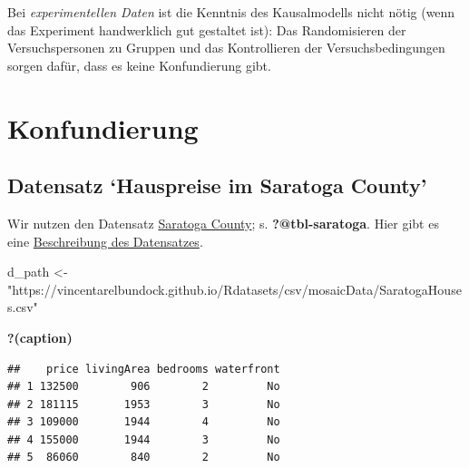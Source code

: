 \documentclass[
  a4paper,
  DIV=11]{scrreprt}
\newenvironment{Shaded}{\begin{snugshade}}{\end{snugshade}}
\newcommand{\NormalTok}[1]{\textcolor[rgb]{0.00,0.23,0.31}{#1}}
\newcommand{\OtherTok}[1]{\textcolor[rgb]{0.00,0.23,0.31}{#1}}
\newcommand{\StringTok}[1]{\textcolor[rgb]{0.13,0.47,0.30}{#1}}
\theoremstyle{definition}
\theoremstyle{remark}
\begin{document}
Bei \emph{experimentellen Daten} ist die Kenntnis des Kausalmodells
nicht nötig (wenn das Experiment handwerklich gut gestaltet ist): Das
Randomisieren der Versuchspersonen zu Gruppen und das Kontrollieren der
Versuchsbedingungen sorgen dafür, dass es keine Konfundierung gibt.

\hypertarget{konfundierung}{%
\section{Konfundierung}\label{konfundierung}}

\newcommand{\indep}{\perp \!\!\! \perp}

\hypertarget{datensatz-hauspreise-im-saratoga-county}{%
\subsection{Datensatz `Hauspreise im Saratoga
County'}\label{datensatz-hauspreise-im-saratoga-county}}

Wir nutzen den Datensatz
\href{https://vincentarelbundock.github.io/Rdatasets/csv/mosaicData/SaratogaHouses.csv}{Saratoga
County}; s. \textbf{?@tbl-saratoga}. Hier gibt es eine
\href{https://vincentarelbundock.github.io/Rdatasets/doc/mosaicData/SaratogaHouses.html}{Beschreibung
des Datensatzes}.

\begin{Shaded}
\begin{Highlighting}[]
\NormalTok{d\_path }\OtherTok{\textless{}{-}} \StringTok{"https://vincentarelbundock.github.io/Rdatasets/csv/mosaicData/SaratogaHouses.csv"}
\end{Highlighting}
\end{Shaded}

\begin{table}

\caption{\textbf{?(caption)}}\begin{minipage}[t]{\linewidth}

{\centering 

\begin{verbatim}
##    price livingArea bedrooms waterfront
## 1 132500        906        2         No
## 2 181115       1953        3         No
## 3 109000       1944        4         No
## 4 155000       1944        3         No
## 5  86060        840        2         No
\end{verbatim}

}

\end{minipage}%

\end{table}
\end{document}
